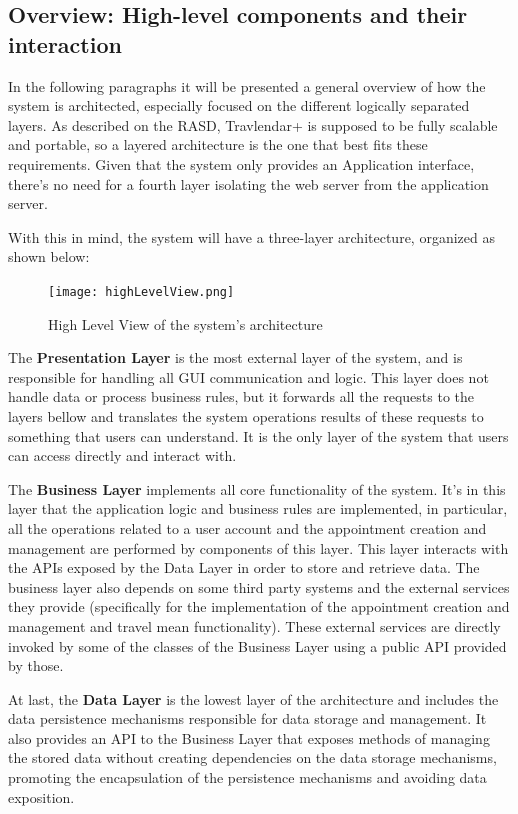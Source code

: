 \documentclass[12pt]{article}
\begin{document}
\subsection{Overview: High-level components and their interaction}

In the following paragraphs it will be presented a general overview of how the system is architected, especially focused on the different logically separated layers.
As described on the RASD, Travlendar+ is supposed to be fully scalable and portable, so a layered architecture is the one that best fits these requirements. Given that the system only provides an Application interface, there's no need for a fourth layer isolating the web server from the application server. 

With this in mind, the system will have a three-layer architecture, organized as shown below:
\begin{figure}[H]
    \centering
    \texttt{[image: highLevelView.png]}
    \caption{High Level View of the system's architecture}
    \label{fig:highLevelView}
\end{figure}
The \textbf{Presentation Layer} is the most external layer of the system, and is responsible for handling all GUI communication and logic. This layer does not handle data or process business rules, but it forwards all the requests to the layers bellow and translates the system operations results of these requests to something that users can understand. It is the only layer of the system that users can access directly and interact with.

The \textbf{Business Layer} implements all core functionality of the system. It's in this layer that the application logic and business rules are implemented, in particular, all the operations related to a user account and the appointment creation and management are performed by components of this layer. This layer interacts with the APIs exposed by the Data Layer in order to store and retrieve data. The business layer also depends on some third party systems and the external services they provide (specifically for the implementation of the appointment creation and management and travel mean functionality). These external services are directly invoked by some of the classes of the Business Layer using a public API provided by those.

At last, the \textbf{Data Layer} is the lowest layer of the architecture and includes the data persistence mechanisms responsible for data storage and management. It also provides an API to the Business Layer that exposes methods of managing the stored data without creating dependencies on the data storage mechanisms, promoting the encapsulation of the persistence mechanisms and avoiding data exposition. 
\end{document}
